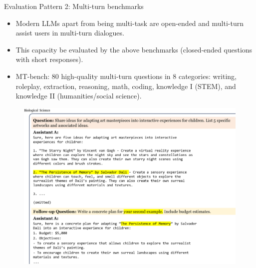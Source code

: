 \documentclass[handout]{beamer}
\begin{document}
\begin{frame}{Evaluation Pattern 2: Multi-turn benchmarks}
\begin{scriptsize}
\begin{itemize}
\item Modern LLMs apart from being multi-task are open-ended and multi-turn assist users in multi-turn dialogues.
\item This capacity be evaluated by the above benchmarks (closed-ended questions with short responses).
\item MT-bench: 80 high-quality multi-turn questions in 8 categories: writing, roleplay, extraction, reasoning, math, coding, knowledge I (STEM), and knowledge II (humanities/social science).
\end{itemize}

      \begin{figure}[h]
	\includegraphics[scale = 0.23]{pics/mtbenchex1.png}
\end{figure}


\end{scriptsize}
\end{frame}
\end{document}
